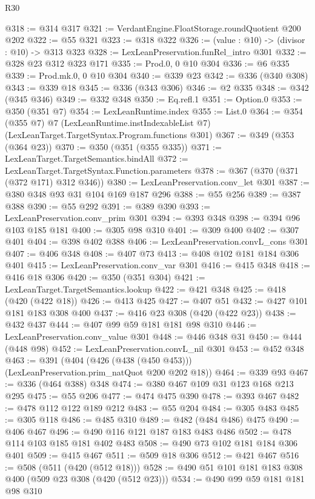 \begin{lexlean}{R30}
\begin{coremodule}
@318 := @314 @317
@321 := VerdantEngine.FloatStorage.roundQuotient @200 @202
@322 := @55 @321
@323 := @318 @322
@326 := (value : @10) -> (divisor : @10) -> @313 @323
@328 := LexLeanPreservation.funRel_intro @301
@332 := @328 @23 @312 @323 @171
@335 := Prod.{0, 0} @10 @304
@336 := @6 @335
@339 := Prod.mk.{0, 0} @10 @304
@340 := @339 @23
@342 := @336 (@340 @308)
@343 := @339 @18
@345 := @336 (@343 @306)
@346 := @2 @335
@348 := @342 (@345 @346)
@349 := @332 @348
@350 := Eq.refl.{1}
@351 := Option.{0}
@353 := @350 (@351 @7)
@354 := LexLeanRuntime.index
@355 := List.{0}
@364 := @354
    (@355 @7)
    @7
    (LexLeanRuntime.instIndexableList @7)
    (LexLeanTarget.TargetSyntax.Program.functions @301)
@367 := @349 (@353 (@364 @23))
@370 := @350 (@351 (@355 @335))
@371 := LexLeanTarget.TargetSemantics.bindAll
@372 := LexLeanTarget.TargetSyntax.Function.parameters
@378 := @367 (@370 (@371 (@372 @171) @312 @346))
@380 := LexLeanPreservation.conv_let @301
@387 := @380 @348 @93 @31 @104 @169 @187 @296
@388 := @55 @256
@389 := @387 @388
@390 := @55 @292
@391 := @389 @390
@393 := LexLeanPreservation.conv_prim @301
@394 := @393 @348
@398 := @394 @96 @103 @185 @181
@400 := @305 @98 @310
@401 := @309 @400
@402 := @307 @401
@404 := @398 @402 @388
@406 := LexLeanPreservation.convL_cons @301
@407 := @406 @348
@408 := @407 @73
@413 := @408 @102 @181 @184 @306 @401
@415 := LexLeanPreservation.conv_var @301
@416 := @415 @348
@418 := @416 @18 @306
@420 := @350 (@351 @304)
@421 := LexLeanTarget.TargetSemantics.lookup
@422 := @421 @348
@425 := @418 (@420 (@422 @18))
@426 := @413 @425
@427 := @407 @51
@432 := @427 @101 @181 @183 @308 @400
@437 := @416 @23 @308 (@420 (@422 @23))
@438 := @432 @437
@444 := @407 @99 @59 @181 @181 @98 @310
@446 := LexLeanPreservation.conv_value @301
@448 := @446 @348 @31
@450 := @444 (@448 @98)
@452 := LexLeanPreservation.convL_nil @301
@453 := @452 @348
@463 := @391 (@404 (@426 (@438 (@450 @453))) (LexLeanPreservation.prim_natQuot @200 @202 @18))
@464 := @339 @93
@467 := @336 (@464 @388) @348
@474 := @380 @467 @109 @31 @123 @168 @213 @295
@475 := @55 @206
@477 := @474 @475 @390
@478 := @393 @467
@482 := @478 @112 @122 @189 @212
@483 := @55 @204
@484 := @305 @483
@485 := @305 @118
@486 := @485 @310
@489 := @482 (@484 @486) @475
@490 := @406 @467
@496 := @490 @116 @121 @187 @183 @483 @486
@502 := @478 @114 @103 @185 @181 @402 @483
@508 := @490 @73 @102 @181 @184 @306 @401
@509 := @415 @467
@511 := @509 @18 @306
@512 := @421 @467
@516 := @508 (@511 (@420 (@512 @18)))
@528 := @490 @51 @101 @181 @183 @308 @400 (@509 @23 @308 (@420 (@512 @23)))
@534 := @490 @99 @59 @181 @181 @98 @310

\end{coremodule}
\end{lexlean}
